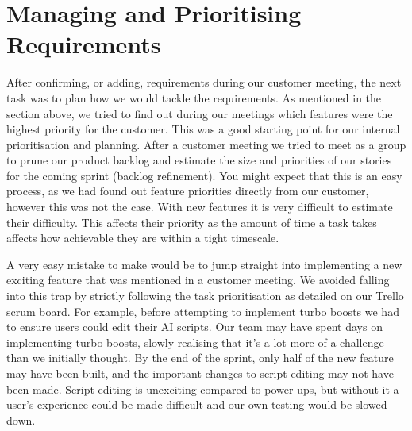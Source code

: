 \section{Managing and Prioritising Requirements}
After confirming, or adding, requirements during our customer meeting, the next task was to plan how we would tackle the requirements. As mentioned in the section above, we tried to find out during our meetings which features were the highest priority for the customer. This was a good starting point for our internal prioritisation and planning. After a customer meeting we tried to meet as a group to prune our product backlog and estimate the size and priorities of our stories for the coming sprint (backlog refinement). You might expect that this is an easy process, as we had found out feature priorities directly from our customer, however this was not the case. With new features it is very difficult to estimate their difficulty. This affects their priority as the amount of time a task takes affects how achievable they are within a tight timescale. 

A very easy mistake to make would be to jump straight into implementing a new exciting feature that was mentioned in a customer meeting. We avoided falling into this trap by strictly following the task prioritisation as detailed on our Trello scrum board. For example, before attempting to implement turbo boosts we had to ensure users could edit their AI scripts. Our team may have spent days on implementing turbo boosts, slowly realising that it's a lot more of a challenge than we initially thought. By the end of the sprint, only half of the new feature may have been built, and the important changes to script editing may not have been made. Script editing is unexciting compared to power-ups, but without it a user's experience could be made difficult and our own testing would be slowed down.

